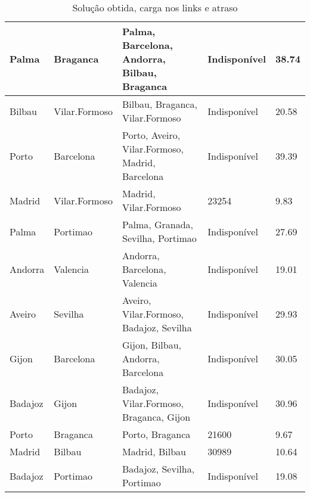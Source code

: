 \begin{table}[!htb]
{\begin{tabular}{|l|l|l|l|l|}
Palma & Braganca & Palma, Barcelona, Andorra, Bilbau, Braganca & Indisponível & 38.74 \\ \hline
Bilbau & Vilar.Formoso & Bilbau, Braganca, Vilar.Formoso & Indisponível & 20.58 \\ \hline
Porto & Barcelona & Porto, Aveiro, Vilar.Formoso, Madrid, Barcelona & Indisponível & 39.39 \\ \hline
Madrid & Vilar.Formoso & Madrid, Vilar.Formoso & 23254 & 9.83 \\ \hline
Palma & Portimao & Palma, Granada, Sevilha, Portimao & Indisponível & 27.69 \\ \hline
Andorra & Valencia & Andorra, Barcelona, Valencia & Indisponível & 19.01 \\ \hline
Aveiro & Sevilha & Aveiro, Vilar.Formoso, Badajoz, Sevilha & Indisponível & 29.93 \\ \hline
Gijon & Barcelona & Gijon, Bilbau, Andorra, Barcelona & Indisponível & 30.05 \\ \hline
Badajoz & Gijon & Badajoz, Vilar.Formoso, Braganca, Gijon & Indisponível & 30.96 \\ \hline
Porto & Braganca & Porto, Braganca & 21600 & 9.67 \\ \hline
Madrid & Bilbau & Madrid, Bilbau & 30989 & 10.64 \\ \hline
Badajoz & Portimao & Badajoz, Sevilha, Portimao & Indisponível & 19.08 \\ \hline
\end{tabular}}
\caption[]{Solução obtida, carga nos links e atraso}
\end{table}

